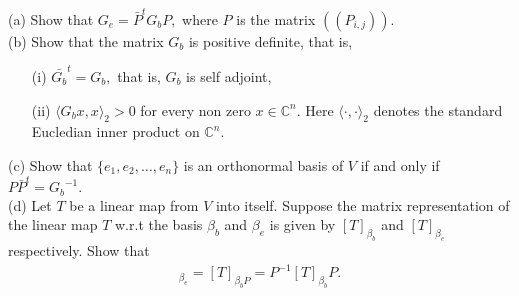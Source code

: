 (a) Show that  $G_e = {\bar{P}}^tG_bP,$ where $P$ is the matrix $(\!( P_{i,j})\!).$\\
(b) Show that the matrix $G_b$ is positive definite, that is, 
\begin{itemize}
\item[(i)] ${\bar{G_b}}^t= G_b,$ that is, $G_b$ is self adjoint,
\item[(ii)] $\langle G_b x,x\rangle_2 > 0$ for every non zero $x\in \mathbb C^n.$ Here $\langle\cdot,\cdot\rangle_2 $ denotes the standard Eucledian inner product on $\mathbb C^n.$
\end{itemize}
(c) Show that $\{e_1,e_2,\ldots,e_n\}$ is an orthonormal basis of $V$ if and only if $P {\bar{P}}^t={G_b}^{-1}.$\\
(d) Let $T$ be a linear map from $V$ into itself. Suppose the matrix representation of the linear map $T$ w.r.t the basis $\beta_b$ and $\beta_e$ is given by $[T]_{\beta_b}$
and $[T]_{\beta_e}$ respectively. Show that 
\begin{align*}
[T]_{\beta_e} = [T]_{{\beta_b}P} = P^{-1}[T]_{\beta_b} P.
\end{align*}
\horz

